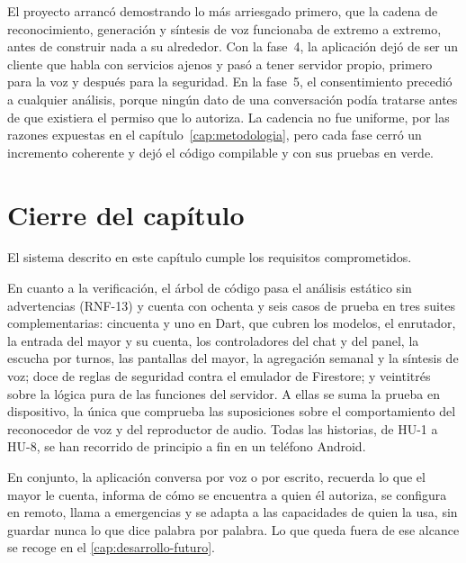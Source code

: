 El proyecto arrancó demostrando lo más arriesgado primero, que la cadena de reconocimiento, generación y síntesis de voz funcionaba de extremo a extremo, antes de construir nada a su alrededor. Con la fase~4, la aplicación dejó de ser un cliente que habla con servicios ajenos y pasó a tener servidor propio, primero para la voz y después para la seguridad. En la fase~5, el consentimiento precedió a cualquier análisis, porque ningún dato de una conversación podía tratarse antes de que existiera el permiso que lo autoriza. La cadencia no fue uniforme, por las razones expuestas en el capítulo~\ref{cap:metodologia}, pero cada fase cerró un incremento coherente y dejó el código compilable y con sus pruebas en verde.

\section{Cierre del capítulo}

El sistema descrito en este capítulo cumple los requisitos comprometidos.

En cuanto a la verificación, el árbol de código pasa el análisis estático sin advertencias (RNF-13) y cuenta con ochenta y seis casos de prueba en tres suites complementarias: cincuenta y uno en Dart, que cubren los modelos, el enrutador, la entrada del mayor y su cuenta, los controladores del chat y del panel, la escucha por turnos, las pantallas del mayor, la agregación semanal y la síntesis de voz; doce de reglas de seguridad contra el emulador de Firestore; y veintitrés sobre la lógica pura de las funciones del servidor. A ellas se suma la prueba en dispositivo, la única que comprueba las suposiciones sobre el comportamiento del reconocedor de voz y del reproductor de audio. Todas las historias, de HU-1 a HU-8, se han recorrido de principio a fin en un teléfono Android.

En conjunto, la aplicación conversa por voz o por escrito, recuerda lo que el mayor le cuenta, informa de cómo se encuentra a quien él autoriza, se configura en remoto, llama a emergencias y se adapta a las capacidades de quien la usa, sin guardar nunca lo que dice palabra por palabra. Lo que queda fuera de ese alcance se recoge en el \autoref{cap:desarrollo-futuro}.

